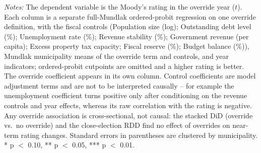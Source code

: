 \begin{table}[!htbp]
\vspace{0.05in}
\begin{minipage}{0.96\textwidth}\footnotesize\emph{Notes:} The dependent variable is the Moody's rating in the override year ($t$). Each column is a separate full-Mundlak ordered-probit regression on one override definition, with the fiscal controls (Population size (log); Outstanding debt level (\%); Unemployment rate (\%); Revenue stability (\%); Government revenue (per capita); Excess property tax capacity; Fiscal reserve (\%); Budget balance (\%)), Mundlak municipality means of the override term and controls, and year indicators; ordered-probit cutpoints are omitted and a higher rating is better. The override coefficient appears in its own column. Control coefficients are model adjustment terms and are not to be interpreted causally -- for example the unemployment coefficient turns positive only after conditioning on the revenue controls and year effects, whereas its raw correlation with the rating is negative. Any override association is cross-sectional, not causal: the stacked DiD (override vs.\ no override) and the close-election RDD find no effect of overrides on near-term rating changes. Standard errors in parentheses are clustered by municipality. * p $<$ 0.10, ** p $<$ 0.05, *** p $<$ 0.01.\end{minipage}
\end{table}
